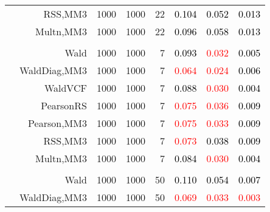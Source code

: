 \documentclass[
]{article}
\begin{document}
\begin{table}[H]
{\begin{tabular}[t]{lrrrrrrr}
\hspace{1em} & RSS,MM3 & 1000 & 1000 & 22 & \textcolor{black}{0.104} & \textcolor{black}{0.052} & \textcolor{black}{0.013}\\

\hspace{1em} & Multn,MM3 & 1000 & 1000 & 22 & \textcolor{black}{0.096} & \textcolor{black}{0.058} & \textcolor{black}{0.013}\\
\cmidrule{1-8}
\addlinespace[0.3em]
\multicolumn{8}{l}{\textbf{2F 10V}}\\
\hspace{1em} & Wald & 1000 & 1000 & 7 & \textcolor{black}{0.093} & \textcolor{red}{0.032} & \textcolor{black}{0.005}\\

\hspace{1em} & WaldDiag,MM3 & 1000 & 1000 & 7 & \textcolor{red}{0.064} & \textcolor{red}{0.024} & \textcolor{black}{0.006}\\

\hspace{1em} & WaldVCF & 1000 & 1000 & 7 & \textcolor{black}{0.088} & \textcolor{red}{0.030} & \textcolor{black}{0.004}\\

\hspace{1em} & PearsonRS & 1000 & 1000 & 7 & \textcolor{red}{0.075} & \textcolor{red}{0.036} & \textcolor{black}{0.009}\\

\hspace{1em} & Pearson,MM3 & 1000 & 1000 & 7 & \textcolor{red}{0.075} & \textcolor{red}{0.033} & \textcolor{black}{0.009}\\

\hspace{1em} & RSS,MM3 & 1000 & 1000 & 7 & \textcolor{red}{0.073} & \textcolor{black}{0.038} & \textcolor{black}{0.009}\\

\hspace{1em} & Multn,MM3 & 1000 & 1000 & 7 & \textcolor{black}{0.084} & \textcolor{red}{0.030} & \textcolor{black}{0.004}\\
\cmidrule{1-8}
\addlinespace[0.3em]
\multicolumn{8}{l}{\textbf{3F 15V}}\\
\hspace{1em} & Wald & 1000 & 1000 & 50 & \textcolor{black}{0.110} & \textcolor{black}{0.054} & \textcolor{black}{0.007}\\

\hspace{1em} & WaldDiag,MM3 & 1000 & 1000 & 50 & \textcolor{red}{0.069} & \textcolor{red}{0.033} & \textcolor{red}{0.003}\\


\end{tabular}}
\end{table}
\end{document}
